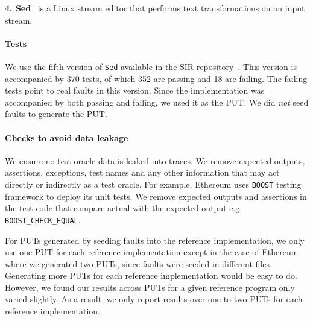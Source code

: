 

\noindent\textbf{4. Sed}~\cite{sed} is a Linux stream editor that performs text transformations on an input stream.
\paragraph{Tests}
We use the fifth version of \texttt{Sed} available in the SIR repository~\cite{sir}. This version is accompanied by 370 tests, of which 352 are passing and 18 are failing. The failing tests  point to real faults in this version. Since the implementation was accompanied by both passing and failing, we used it as the PUT. We did \emph{not} seed faults to generate the PUT. 

\paragraph{Checks to avoid data leakage}
We ensure no test oracle data is leaked into traces. We remove expected outputs, assertions, exceptions, test names and any other information that may act directly or indirectly as a test oracle. For example, Ethereum uses \texttt{BOOST} testing framework to deploy its unit tests. We remove expected outputs and assertions in the test code that compare actual with the expected output e.g. \texttt{BOOST\_CHECK\_EQUAL}. %

For PUTs generated by seeding faults into the reference implementation, we only use one PUT for each reference implementation except in the case of Ethereum where we generated two PUTs, since faults were seeded in different files. Generating more PUTs for each reference implementation would be easy to do. However, we found our results across PUTs for a given reference program only varied slightly. As a result, we only report results over one to two PUTs for each reference implementation. 


